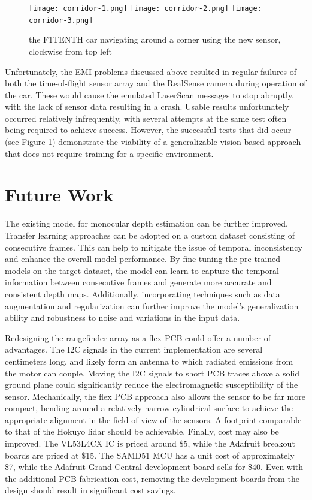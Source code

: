 \documentclass[conference]{IEEEtran}
\begin{document}
\begin{figure}
\centering
\texttt{[image: corridor-1.png]}
\texttt{[image: corridor-2.png]}
\texttt{[image: corridor-3.png]}
\caption{the F1TENTH car navigating around a corner using the new sensor,
         clockwise from top left}
\label{fig:moving-car}
\end{figure}


Unfortunately, the EMI problems discussed above resulted in regular failures of
both the time-of-flight sensor array and the RealSense camera during operation
of the car. These would cause the emulated LaserScan messages to stop abruptly,
with the lack of sensor data resulting in a crash. Usable results unfortunately
occurred relatively infrequently, with several attempts at the same test often
being required to achieve success. However, the successful tests that did occur
(see Figure \ref{fig:moving-car}) demonstrate the viability of a generalizable
vision-based approach that does not require training for a specific
environment.


\section{Future Work}
The existing model for monocular depth estimation can be further improved. Transfer learning approaches can be adopted on a custom dataset consisting of consecutive frames. This can help to mitigate the issue of temporal inconsistency and enhance the overall model performance. By fine-tuning the pre-trained models on the target dataset, the model can learn to capture the temporal information between consecutive frames and generate more accurate and consistent depth maps. Additionally, incorporating techniques such as data augmentation and regularization can further improve the model's generalization ability and robustness to noise and variations in the input data.

Redesigning the rangefinder array as a flex PCB could offer a number of
advantages. The I2C signals in the current implementation are several
centimeters long, and likely form an antenna to which radiated emissions from
the motor can couple. Moving the I2C signals to short PCB traces above a solid
ground plane could significantly reduce the electromagnetic susceptibility of
the sensor. Mechanically, the flex PCB approach also allows the sensor to be
far more compact, bending around a relatively narrow cylindrical surface to
achieve the appropriate alignment in the field of view of the sensors. A
footprint comparable to that of the Hokuyo lidar should be achievable. Finally,
cost may also be improved. The VL53L4CX IC is priced around \$5, while the
Adafruit breakout boards are priced at \$15. The SAMD51 MCU has a unit cost of
approximately \$7, while the Adafruit Grand Central development board
sells for \$40. Even with the additional PCB fabrication cost, removing the
development boards from the design should result in significant cost savings.
\end{document}
